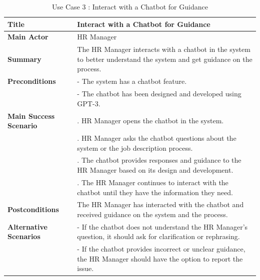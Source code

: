 \begin{table}[H]
    \renewcommand{\arraystretch}{1.5}%
    \caption{Use Case 3 : Interact with a Chatbot for Guidance}
    \centering
    \medskip
    \small
    \begin{tabularx}{1.2\textwidth} {
            | >{\hsize=0.4\hsize\raggedright\arraybackslash}X
            | >{\hsize=1.6\hsize\raggedright\arraybackslash}X |}
        \hline
        \textbf{Title}                 & Interact with a Chatbot for Guidance                                                                                   \\
        \hline
        \textbf{Main Actor}            & HR Manager                                                                                                             \\
        \hline
        \textbf{Summary}               & The HR Manager interacts with a chatbot in the system to better understand the system and get guidance on the process. \\
        \hline
        \textbf{Preconditions}         & - The system has a chatbot feature.                                                                                    \\
                                       & - The chatbot has been designed and developed using GPT-3.                                                             \\
        \hline
        \textbf{Main Success Scenario} & 1. HR Manager opens the chatbot in the system.                                                                         \\
                                       & 2. HR Manager asks the chatbot questions about the system or the job description process.                              \\
                                       & 3. The chatbot provides responses and guidance to the HR Manager based on its design and development.                  \\
                                       & 4. The HR Manager continues to interact with the chatbot until they have the information they need.                    \\
        \hline
        \textbf{Postconditions}        & The HR Manager has interacted with the chatbot and received guidance on the system and the process.                    \\
        \hline
        \textbf{Alternative Scenarios} & - If the chatbot does not understand the HR Manager's question, it should ask for clarification or rephrasing.         \\
                                       & - If the chatbot provides incorrect or unclear guidance, the HR Manager should have the option to report the issue.    \\
        \hline
    \end{tabularx}
    \normalsize
\end{table}

